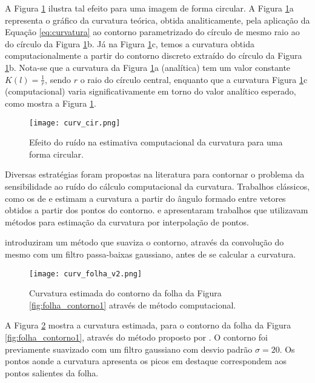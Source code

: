 A Figura \ref{fig:cir1} ilustra tal efeito para uma imagem de forma circular. A Figura \ref{fig:cir1}a representa o gráfico da curvatura teórica, obtida analiticamente, pela aplicação da Equação \ref{eq:curvatura} ao contorno parametrizado do círculo de mesmo raio ao do círculo da Figura \ref{fig:cir1}b. Já na  Figura \ref{fig:cir1}c, temos a curvatura obtida computacionalmente a partir do contorno discreto extraído do círculo da Figura \ref{fig:cir1}b. Nota-se que a curvatura da Figura \ref{fig:cir1}a (analítica) tem um valor constante $K(l) = \frac{1}{r}$, sendo $r$ o raio do círculo central, enquanto que a curvatura Figura \ref{fig:cir1}c (computacional) varia significativamente em torno do valor analítico esperado, como mostra a Figura \ref{fig:cir1}. 

\begin{figure}[h!]
  \caption{\label{fig:cir1} Efeito do ruído na estimativa computacional da curvatura para uma forma circular.}
  \centering
  \texttt{[image: curv\_cir.png]}
\end{figure}

Diversas estratégias foram propostas na literatura para contornar o problema da sensibilidade ao ruído do cálculo computacional da curvatura. Trabalhos clássicos, como os de  e  estimam a curvatura a partir do ângulo formado entre vetores obtidos a partir dos pontos do contorno.  e  apresentaram trabalhos que utilizavam métodos para estimação da curvatura por interpolação de pontos. 

 introduziram um método que suaviza o contorno, através da convolução do mesmo com um filtro passa-baixas \color{red}gaussiano\color{black}, antes de se calcular a curvatura.

\begin{figure}[h!]
 \caption{\label{fig:curv_folha} Curvatura estimada do contorno da folha da Figura \ref{fig:folha_contorno1} através de método computacional.}
  \centering
  \texttt{[image: curv\_folha\_v2.png]}
\end{figure}

A Figura \ref{fig:curv_folha} mostra a curvatura estimada, para o contorno da folha da Figura \ref{fig:folha_contorno1}, através do método proposto por . O contorno foi previamente suavizado com um filtro gaussiano com desvio padrão $\sigma = 20$. Os pontos aonde a curvatura apresenta os picos em destaque correspondem aos pontos salientes da folha. 

